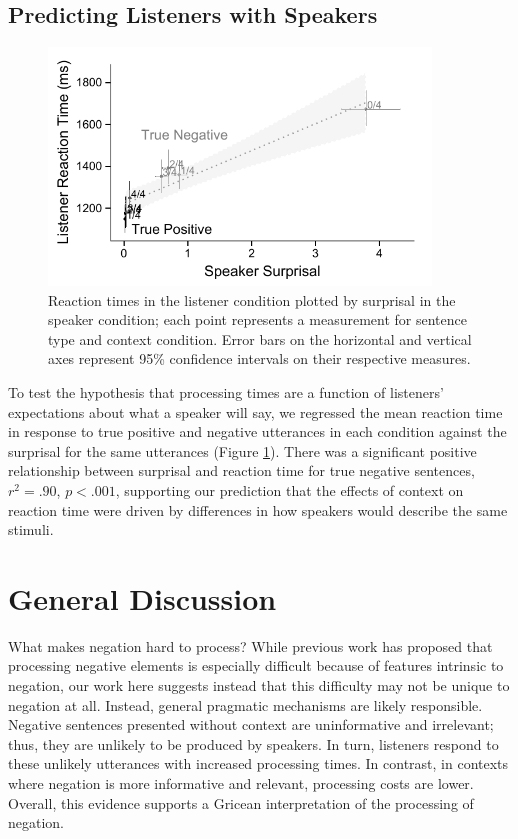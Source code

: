 \documentclass[man, noapacite]{apa2}
\begin{document}
\subsection{Predicting Listeners with Speakers}

\begin{figure}[t]
\begin{center} 
\includegraphics[width=4in]{figures/production_rts_mod.pdf}
\caption{\label{fig:scatter} Reaction times in the listener condition plotted by surprisal in the speaker condition; each point represents a measurement for sentence type and context condition. Error bars on the horizontal and vertical axes represent 95\% confidence intervals on their respective measures.}
\end{center} 
\end{figure}

To test the hypothesis that processing times are a function of listeners' expectations about what a speaker will say, we regressed the mean reaction time in response to true positive and negative utterances in each condition against the surprisal for the same utterances (Figure \ref{fig:scatter}).  There was a significant positive relationship between surprisal and reaction time for true negative sentences, $r^2=.90$, $p<.001$, supporting our prediction that the effects of context on reaction time were driven by differences in how speakers would describe the same stimuli.  

\section{General Discussion}

What makes negation hard to process? While previous work has proposed that processing negative elements is especially difficult because of features intrinsic to negation, our work here suggests instead that this difficulty may not be unique to negation at all. Instead, general pragmatic mechanisms are likely responsible. Negative sentences presented without context are uninformative and irrelevant; thus, they are unlikely to be produced by speakers. In turn, listeners respond to these unlikely utterances with increased processing times. In contrast, in contexts where negation is more informative and relevant, processing costs are lower. Overall, this evidence supports a Gricean interpretation of the processing of negation.
\end{document}
